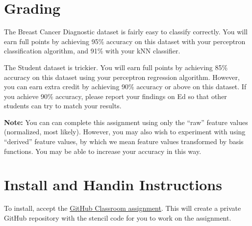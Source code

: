 \documentclass{article}
\begin{document}




\section{Grading}

The Breast Cancer Diagnostic dataset is fairly easy to classify correctly.
You will earn full points by achieving 95\% accuracy on this dataset with your perceptron classification algorithm, and 91\% with your kNN classifier.

The Student dataset is trickier.
You will earn full points by achieving 85\% accuracy on this dataset using your perceptron regression algorithm.
However, you can earn extra credit by achieving 90\% accuracy or above on this dataset.
If you achieve 90\% accuracy, please report your findings on Ed so that other students can try to match your results.

\textbf{Note:}
You can can complete this assignment using only the ``raw'' feature values (normalized, most likely).
However, you may also wish to experiment with using ``derived'' feature values,
by which we mean feature values transformed by basis functions.
You may be able to increase your accuracy in this way.


\section{Install and Handin Instructions}
To install, accept the \href{https://classroom.github.com/a/K0iVrEtu}{GitHub Classroom assignment}. This will create a private GitHub repository with the stencil code for you to work on the
assignment. \\
\end{document}
